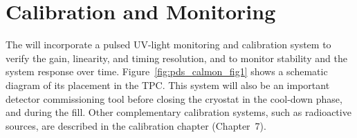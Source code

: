 \section{Calibration and Monitoring}
\label{sec:fdsp-pd-CandM}




The  will incorporate a  pulsed UV-light monitoring and calibration system %
to verify the  gain, linearity, and timing resolution, and to monitor stability and the system response over time.  Figure~\ref{fig:pds_calmon_fig1} shows a schematic diagram of its placement in the TPC. This system will also be an important detector commissioning tool before closing the cryostat  
in the cool-down phase, and during the \lar fill.
Other complementary calibration systems, such as radioactive sources, are described in the  calibration chapter (Chapter~7). 

